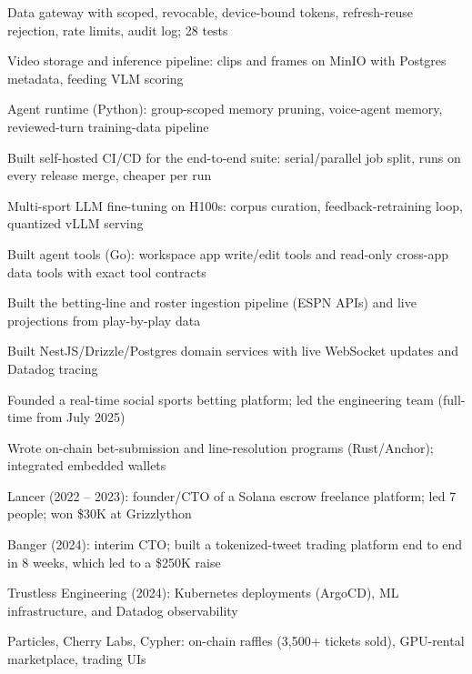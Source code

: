 \documentclass[print]{jack-resume}
\begin{document}
\begin{tightemize}
    \item Data gateway with scoped, revocable, device-bound tokens, refresh-reuse rejection, rate limits, audit log; 28 tests
    \item Video storage and inference pipeline: clips and frames on MinIO with Postgres metadata, feeding VLM scoring
    \item Agent runtime (Python): group-scoped memory pruning, voice-agent memory, reviewed-turn training-data pipeline
    \item Built self-hosted CI/CD for the end-to-end suite: serial/parallel job split, runs on every release merge, cheaper per run
    \item Multi-sport LLM fine-tuning on H100s: corpus curation, feedback-retraining loop, quantized vLLM serving
    \item Built agent tools (Go): workspace app write/edit tools and read-only cross-app data tools with exact tool contracts
\end{tightemize}
\sectionsep

\begin{tightemize}
    \item Built the betting-line and roster ingestion pipeline (ESPN APIs) and live projections from play-by-play data
    \item Built NestJS/Drizzle/Postgres domain services with live WebSocket updates and Datadog tracing
    \item Founded a real-time social sports betting platform; led the engineering team (full-time from July 2025)
    \item Wrote on-chain bet-submission and line-resolution programs (Rust/Anchor); integrated embedded wallets
\end{tightemize}
\sectionsep

\begin{tightemize}
    \item Lancer (2022 – 2023): founder/CTO of a Solana escrow freelance platform; led 7 people; won \$30K at Grizzlython
    \item Banger (2024): interim CTO; built a tokenized-tweet trading platform end to end in 8 weeks, which led to a \$250K raise
    \item Trustless Engineering (2024): Kubernetes deployments (ArgoCD), ML infrastructure, and Datadog observability
    \item Particles, Cherry Labs, Cypher: on-chain raffles (3,500+ tickets sold), GPU-rental marketplace, trading UIs
\end{tightemize}
\sectionsep
\end{document}
